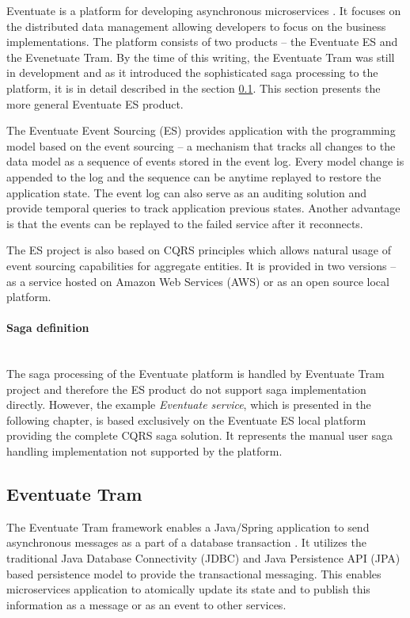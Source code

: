 \documentclass[oneside,
  digital, %
  table,   %
  lof,     %
  lot,     %
]{fithesis3}
\newcommand{\newlinepar}[1]{\paragraph{#1}\needspace{4\baselineskip}\mbox{}\\}
\begin{document}
Eventuate is a platform for developing asynchronous microservices \cite{eventuate.io}. It focuses on the distributed data management allowing developers to focus on the business implementations. The platform consists of two products -- the Eventuate ES and the Evenetuate Tram. By the time of this writing, the Eventuate Tram was still in development and as it introduced the sophisticated saga processing to the platform, it is in detail described in the section \ref{sec:eventuate-tram}. This section presents the more general Eventuate ES product.

The Eventuate Event Sourcing (ES) provides application with the programming model based on the event sourcing -- a mechanism that tracks all changes to the data model as a sequence of events stored in the event log. Every model change is appended to the log and the sequence can be anytime replayed to restore the application state. The event log can also serve as an auditing solution and provide temporal queries to track application previous states. Another advantage is that the events can be replayed to the failed service after it reconnects.


The ES project is also based on CQRS principles which allows natural usage of event sourcing capabilities for aggregate entities. It is provided in two versions -- as a service hosted on Amazon Web Services (AWS) or as an open source local platform.

\newlinepar{Saga definition}

The saga processing of the Eventuate platform is handled by Eventuate Tram project and therefore the ES product do not support saga implementation directly. However, the example \textit{Eventuate service}, which is presented in the following chapter, is based exclusively on the Eventuate ES local platform providing the complete CQRS saga solution. It represents the manual user saga handling implementation not supported by the platform. 

\subsection{Eventuate Tram}
\label{sec:eventuate-tram}

The Eventuate Tram framework enables a Java/Spring application to send asynchronous messages as a part of a database transaction \cite{eventuate-tram}. It utilizes the traditional Java Database Connectivity (JDBC) and Java Persistence API (JPA) based persistence model to provide the transactional messaging. This enables microservices application to atomically update its state and to publish this information as a message or as an event to other services.
\end{document}

